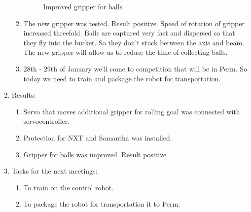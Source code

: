 \begin{enumerate}
\begin{enumerate}
\begin{figure}[H]
\begin{minipage}[h]{0.24\linewidth}
	  	  \end{minipage}
	  	  \caption{Improved gripper for balls}
	   \end{figure}
	   
	   \item The new gripper was tested. Result positive. Speed of rotation of gripper increased threefold. Balls are captured very fast and dispersed so that they fly into the bucket. So they don't stuck between the axis and beam. The new gripper will allow us to reduse the time of collecting balls.
	   
	   \item 28th - 29th of January we'll come to competition that will be in Perm. So today we need to train and package the robot for transportation.

	\end{enumerate}
	
	\item Results:
	\begin{enumerate}
		
		\item Servo that moves additional gripper for rolling goal was connected with servocontroller.
		
		\item Protection for NXT and Samantha was installed.
		
        \item Gripper for balls was improved. Result positive
		
	\end{enumerate}
	
	\item Tasks for the next meetings:
	\begin{enumerate}
		
		\item To train on the control robot.
		
		\item To package the robot for transportation it to Perm.
			
	\end{enumerate}
\end{enumerate}
\fillpage
